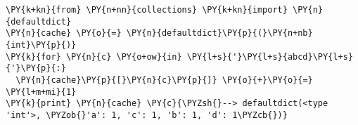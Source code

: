 \begin{Verbatim}[commandchars=\\\{\}]
\PY{k+kn}{from} \PY{n+nn}{collections} \PY{k+kn}{import} \PY{n}{defaultdict}
\PY{n}{cache} \PY{o}{=} \PY{n}{defaultdict}\PY{p}{(}\PY{n+nb}{int}\PY{p}{)}
\PY{k}{for} \PY{n}{c} \PY{o+ow}{in} \PY{l+s}{'}\PY{l+s}{abcd}\PY{l+s}{'}\PY{p}{:}
  \PY{n}{cache}\PY{p}{[}\PY{n}{c}\PY{p}{]} \PY{o}{+}\PY{o}{=} \PY{l+m+mi}{1}
\PY{k}{print} \PY{n}{cache} \PY{c}{\PYZsh{}--> defaultdict(<type 'int'>, \PYZob{}'a': 1, 'c': 1, 'b': 1, 'd': 1\PYZcb{})}
\end{Verbatim}
